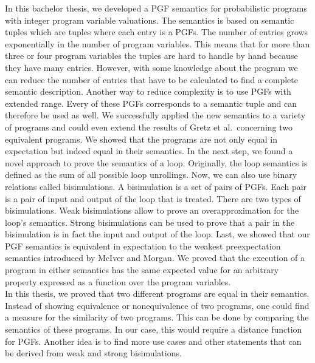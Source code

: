 In this bachelor thesis, we developed a PGF semantics for probabilistic programs with integer program variable valuations.
The semantics is based on semantic tuples which are tuples where each entry is a PGFs.
The number of entries grows exponentially in the number of program variables.
This means that for more than three or four program variables the tuples are hard to handle by hand because they have many entries.
However, with some knowledge about the program we can reduce the number of entries that have to be calculated to find a complete semantic description.
Another way to reduce complexity is to use PGFs with extended range.
Every of these PGFs corresponds to a semantic tuple and can therefore be used as well.
We successfully applied the new semantics to a variety of programs and could even extend the results of Gretz et al.\ concerning two equivalent programs.
We showed that the programs are not only equal in expectation but indeed equal in their semantics.
In the next step, we found a novel approach to prove the semantics of a loop.
Originally, the loop semantics is defined as the sum of all possible loop unrollings.
Now, we can also use binary relations called bisimulations.
A bisimulation is a set of pairs of PGFs.
Each pair is a pair of input and output of the loop that is treated.
There are two types of bisimulations.
Weak bisimulations allow to prove an overapproximation for the loop's semantics.
Strong bisimulations can be used to prove that a pair in the bisimulation is in fact the input and output of the loop.
Last, we showed that our PGF semantics is equivalent in expectation to the weakest preexpectation semantics introduced by McIver and Morgan.
We proved that the execution of a program in either semantics has the same expected value for an arbitrary property expressed as a function over the program variables. \\
In this thesis, we proved that two different programs are equal in their semantics.
Instead of showing equivalence or nonequivalence of two programs, one could find a measure for the similarity of two programs.
This can be done by comparing the semantics of these programs.
In our case, this would require a distance function for PGFs.
Another idea is to find more use cases and other statements that can be derived from weak and strong bisimulations.


